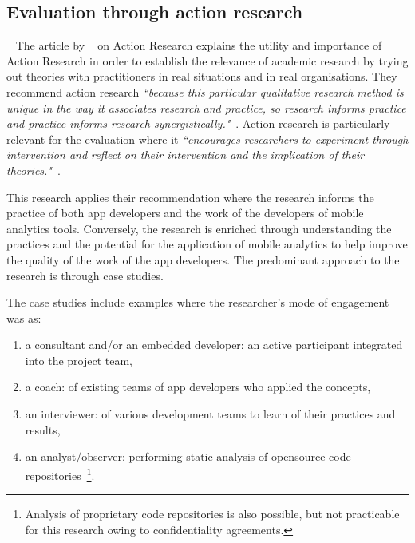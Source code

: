 \subsection{Evaluation through action research}~\label{section-evaluation-through-action-research-method}
The article by ~\citet*{avison1999_action_research} on Action Research explains the utility and importance of Action Research in order to establish the relevance of academic research by trying out theories with practitioners in real situations and in real organisations. They recommend action research \emph{``because this particular qualitative research method is unique in the way it associates research and practice, so research informs practice and practice informs research synergistically."}~\citep[p.94]{avison1999_action_research}. Action research is particularly relevant for the evaluation where it \emph{``encourages researchers to experiment through intervention and reflect on their intervention and the implication of their theories."}~\citep[p.95]{avison1999_action_research}. 

This research applies their recommendation where the research informs the practice of both app developers and the work of the developers of mobile analytics tools. Conversely, the research is enriched through understanding the practices and the potential for the application of mobile analytics to help improve the quality of the work of the app developers. The predominant approach to the research is through case studies.

The case studies include examples where the researcher's mode of engagement was as:
\begin{enumerate}
    \itemsep0em
    \item a consultant and/or an embedded developer: an active participant integrated into the project team,
    \item a coach: of existing teams of app developers who applied the concepts,
    \item an interviewer: of various development teams to learn of their practices and results,
    \item an analyst/observer: performing static analysis of opensource code repositories~\footnote{Analysis of proprietary code repositories is also possible, but not practicable for this research owing to confidentiality agreements.}.
\end{enumerate}

